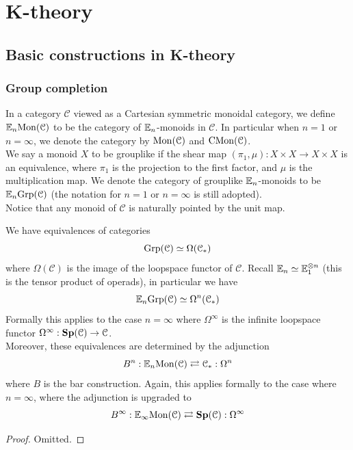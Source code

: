 \part{K-theory}

\chapter{Basic constructions in K-theory}

\section{Group completion}

	\begin{defn}
		In a category $\mathcal{C}$ viewed as a Cartesian symmetric monoidal category, we define $\mathbb{E}_n\mathrm{Mon}(\mathcal{C})$ to be the category of $\mathbb{E}_n$-monoids in $\mathcal{C}$. In particular when $n=1$ or $n=\infty$, we denote the category by $\mathrm{Mon}(\mathcal{C})$ and $\mathrm{CMon}(\mathcal{C})$. \\
		We say a monoid $X$ to be grouplike if the shear map $(\pi_1,\mu):X\times X\to X\times X$ is an equivalence, where $\pi_1$ is the projection to the first factor, and $\mu$ is the multiplication map. We denote the category of grouplike $\mathbb{E}_n$-monoids to be $\mathbb{E}_n\mathrm{Grp}(\mathcal{C})$ (the notation for $n=1$ or $n=\infty$ is still adopted). \\
		Notice that any monoid of $\mathcal{C}$ is naturally pointed by the unit map. 
	\end{defn}

	\begin{thm}\label{Recognition_principle}
		We have equivalences of categories 
		\[ \mathrm{Grp}(\mathcal{C})\simeq\Omega(\mathcal{C}_*) \]
		where $\Omega(\mathcal{C})$ is the image of the loopspace functor of $\mathcal{C}$. Recall $\mathbb{E}_n\simeq\mathbb{E}_1^{\otimes n}$ (this is the tensor product of operads), in particular we have 
		\[ \mathbb{E}_n\mathrm{Grp}(\mathcal{C})\simeq\Omega^n(\mathcal{C}_*) \]
		Formally this applies to the case $n=\infty$ where $\Omega^\infty$ is the infinite loopspace functor $\Omega^\infty:\mathbf{Sp}(\mathcal{C})\to\mathcal{C}$. \\
		Moreover, these equivalences are determined by the adjunction 
		\[ B^n:\mathbb{E}_n\mathrm{Mon}(\mathcal{C})\rightleftarrows\mathcal{C}_*:\Omega^n \]
		where $B$ is the bar construction. Again, this applies formally to the case where $n=\infty$, where the adjunction is upgraded to 
		\[ B^\infty:\mathbb{E}_\infty\mathrm{Mon}(\mathcal{C})\rightleftarrows\mathbf{Sp}(\mathcal{C}):\Omega^\infty \]
	\end{thm}
	\begin{proof}
		Omitted. 
	\end{proof}

